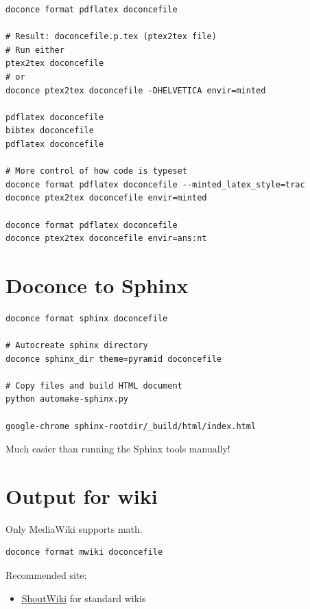 \documentclass[%
twoside,                 %
final,                   %
chapterprefix=true,      %
open=right               %
10pt]{book}
\newcounter{doconce:movie:counter}
\newcounter{doconce:exercise:counter}
\begin{document}
\begin{Verbatim}[numbers=none,fontsize=\fontsize{9pt}{9pt},baselinestretch=0.95]
doconce format pdflatex doconcefile

# Result: doconcefile.p.tex (ptex2tex file)
# Run either
ptex2tex doconcefile
# or
doconce ptex2tex doconcefile -DHELVETICA envir=minted

pdflatex doconcefile
bibtex doconcefile
pdflatex doconcefile

# More control of how code is typeset
doconce format pdflatex doconcefile --minted_latex_style=trac
doconce ptex2tex doconcefile envir=minted

doconce format pdflatex doconcefile
doconce ptex2tex doconcefile envir=ans:nt
\end{Verbatim}

\section*{Doconce to Sphinx}

\begin{Verbatim}[numbers=none,fontsize=\fontsize{9pt}{9pt},baselinestretch=0.95]
doconce format sphinx doconcefile

# Autocreate sphinx directory
doconce sphinx_dir theme=pyramid doconcefile

# Copy files and build HTML document
python automake-sphinx.py

google-chrome sphinx-rootdir/_build/html/index.html
\end{Verbatim}

Much easier than running the Sphinx tools manually!

\section*{Output for wiki}

Only MediaWiki supports math.

\begin{Verbatim}[numbers=none,fontsize=\fontsize{9pt}{9pt},baselinestretch=0.95]
doconce format mwiki doconcefile
\end{Verbatim}


Recommended site:

\begin{itemize}
 \item \href{{http://doconcedemo.shoutwiki.com/wiki/Doconce_demo_page}}{ShoutWiki}
   for standard wikis
\end{itemize}
\end{document}
